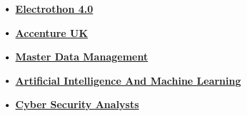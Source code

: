 \documentclass[letterpaper,11pt]{article}
\newcommand\sbullet[1][.5]{\mathbin{\vcenter{\hbox{\scalebox{#1}{$\bullet$}}}}}
\begin{document}
$\sbullet[.75] \hspace{0.2cm}${\href{https://drive.google.com/file/d/1aUDUl7zJrUzR8-OVfV0EjoFujFhVK_-v/view?usp=sharing}{\textbf{Electrothon 4.0} \href{https://drive.google.com/file/d/1aUDUl7zJrUzR8-OVfV0EjoFujFhVK_-v/view?usp=sharing}{\raisebox{-0.1\height}\faExternalLink }}}\hspace{1.45cm}


$\sbullet[.75]
\hspace{0.2cm}${\href{https://drive.google.com/file/d/1Au42EnRZEBSWkKiD_ZS5HIYw5AkdChxZ/view?usp=sharing}{\textbf{Accenture UK} \href{https://drive.google.com/file/d/1aUDUl7zJrUzR8-OVfV0EjoFujFhVK_-v/view?usp=sharing}{\raisebox{-0.1\height}\faExternalLink }}}\hspace{1.45cm}

$\sbullet[.75]
\hspace{0.2cm}${\href{https://drive.google.com/file/d/11fP0tGZiKbFDTOAxm8ty6FJ1pqB5jjgc/view?usp=sharing}{\textbf{Master Data Management} \href{https://drive.google.com/file/d/1aUDUl7zJrUzR8-OVfV0EjoFujFhVK_-v/view?usp=sharing}{\raisebox{-0.1\height}\faExternalLink }}}\hspace{1.45cm}

$\sbullet[.75]
\hspace{0.2cm}${\href{https://drive.google.com/file/d/1uAnmPpIQgorO3vPccSSnFBxkCPnDz-eb/view?usp=sharing}{\textbf{Artificial Intelligence And Machine Learning} \href{https://drive.google.com/file/d/1aUDUl7zJrUzR8-OVfV0EjoFujFhVK_-v/view?usp=sharing}{\raisebox{-0.1\height}\faExternalLink }}}\hspace{1.45cm}

$\sbullet[.75]
\hspace{0.2cm}${\href{https://drive.google.com/file/d/1LAldrHQg0bYuHuPoF4uVmDUtOgR5JX61/view?usp=sharing}{\textbf{Cyber Security Analysts} \href{https://drive.google.com/file/d/1aUDUl7zJrUzR8-OVfV0EjoFujFhVK_-v/view?usp=sharing}{\raisebox{-0.1\height}\faExternalLink }}}\hspace{1.45cm}
\end{document}
